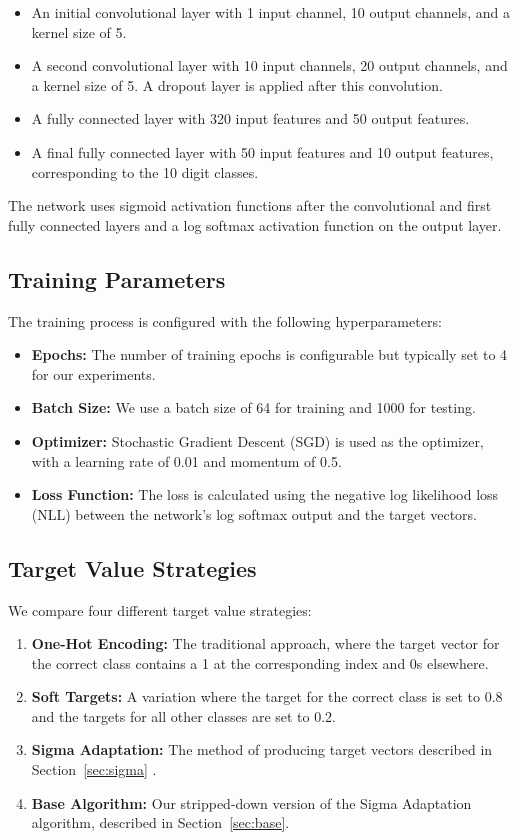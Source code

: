 \documentclass[12pt,fleqn,a4paper]{article}
\begin{document}
 \begin{itemize}
     \item An initial convolutional layer with 1 input channel, 10 output channels, and a kernel size of 5.
     \item A second convolutional layer with 10 input channels, 20 output channels, and a kernel size of 5. A dropout layer is applied after this convolution.
     \item A fully connected layer with 320 input features and 50 output features.
     \item A final fully connected layer with 50 input features and 10 output features, corresponding to the 10 digit classes.
 \end{itemize}
 The network uses sigmoid activation functions after the convolutional and first fully connected layers and a log softmax activation function on the output layer.

 \subsection{Training Parameters}
 The training process is configured with the following hyperparameters:
 \begin{itemize}
     \item \textbf{Epochs:} The number of training epochs is configurable but typically set to 4 for our experiments.
     \item \textbf{Batch Size:} We use a batch size of 64 for training and 1000 for testing.
     \item \textbf{Optimizer:} Stochastic Gradient Descent (SGD) is used as the optimizer, with a learning rate of 0.01 and momentum of 0.5.
     \item \textbf{Loss Function:} The loss is calculated using the negative log likelihood loss (NLL) between the network's log softmax output and the target vectors.
 \end{itemize}

 \subsection{Target Value Strategies}
 We compare four different target value strategies:
 \begin{enumerate}
     \item \textbf{One-Hot Encoding:} The traditional approach, where the target vector for the correct class contains a 1 at the corresponding index and 0s elsewhere.
     \item \textbf{Soft Targets:} A variation where the target for the correct class is set to 0.8 and the targets for all other classes are set to 0.2.
     \item \textbf{Sigma Adaptation:} The method of producing target vectors described in Section~\ref{sec:sigma} \cite{begic}.
     \item \textbf{Base Algorithm:} Our stripped-down version of the Sigma Adaptation algorithm, described in Section~\ref{sec:base}.
 \end{enumerate}
\end{document}
